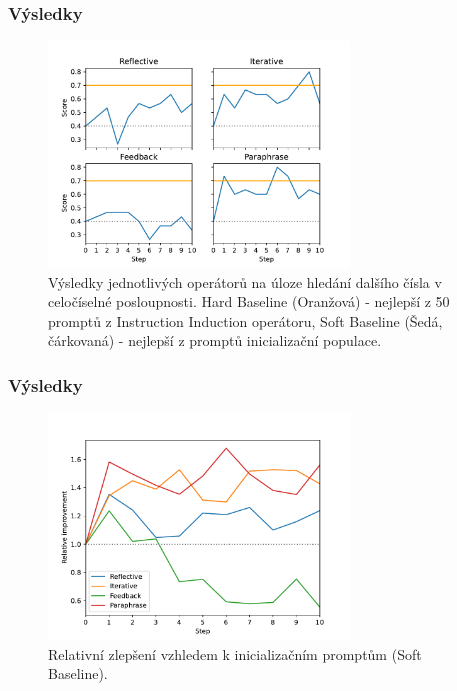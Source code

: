 \documentclass[aspectratio=169]{beamer}
\begin{document}
\begin{frame}
	\frametitle{Výsledky}
	\begin{figure}
		\includegraphics[width=8cm]{sequences.pdf}
		\caption{Výsledky jednotlivých operátorů na úloze hledání dalšího čísla v celočíselné posloupnosti. Hard Baseline (Oranžová) - nejlepší z 50 promptů z Instruction Induction operátoru, Soft Baseline (Šedá, čárkovaná) - nejlepší z promptů inicializační populace.}
	\end{figure}
\end{frame}

\begin{frame}
	\frametitle{Výsledky}
	\begin{figure}
		\includegraphics[width=8cm]{relative.pdf}
		\caption{Relativní zlepšení vzhledem k inicializačním promptům (Soft Baseline).}
	\end{figure}
\end{frame}
\end{document}
